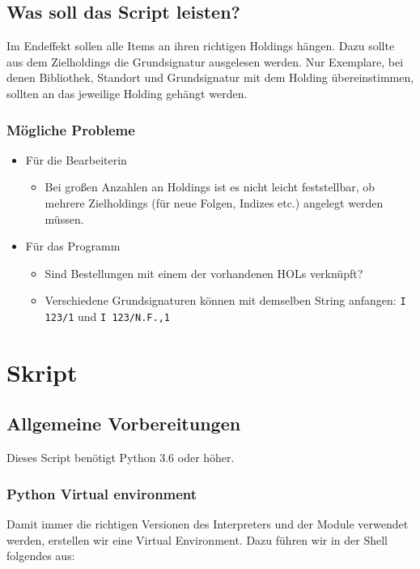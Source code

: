 \documentclass[10pt, a4paper]{scrartcl}
\begin{document}
\subsection{Was soll das Script leisten?}
\label{sec:org64e7b7e}
Im Endeffekt sollen alle Items an ihren richtigen Holdings hängen. Dazu
sollte aus dem Zielholdings die Grundsignatur ausgelesen werden. Nur
Exemplare, bei denen Bibliothek, Standort und Grundsignatur mit dem Holding
übereinstimmen, sollten an das jeweilige Holding gehängt werden.


\subsubsection{Mögliche Probleme}
\label{sec:org03a6b5a}
\begin{itemize}
\item Für die Bearbeiterin
\begin{itemize}
\item Bei großen Anzahlen an Holdings ist es nicht leicht feststellbar, ob
mehrere Zielholdings (für neue Folgen, Indizes etc.) angelegt werden
müssen.
\end{itemize}
\item Für das Programm
\begin{itemize}
\item Sind Bestellungen mit einem der vorhandenen HOLs verknüpft?
\item Verschiedene Grundsignaturen können mit demselben String anfangen: \texttt{I
          123/1} und \texttt{I 123/N.F.,1}
\end{itemize}
\end{itemize}

\section{Skript}
\label{sec:orga97f21d}

\subsection{Allgemeine Vorbereitungen}
\label{sec:org91ee690}
Dieses Script benötigt Python 3.6 oder höher.
\subsubsection{Python Virtual environment}
\label{sec:orged6d5e4}
Damit immer die richtigen Versionen des Interpreters und der Module
verwendet werden, erstellen wir eine Virtual Environment. Dazu führen wir
in der Shell folgendes aus:
\end{document}
